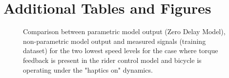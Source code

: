 \chapter{Additional Tables and Figures}\label{ch:appD}


\begin{figure}[!h]
    \centering
    \begin{subfigure}[b]{\textwidth}
        \centering
        \caption{}
        \label{fig:zdm_fit1}
    \end{subfigure}
    \begin{subfigure}[b]{\textwidth}
        \centering
        \caption{}
        \label{fig:zdm_fit2}
    \end{subfigure}
    
    \caption{Comparison between parametric model output (Zero Delay Model), non-parametric model output and measured signals (training dataset) for the two lowest speed levels for the case where torque feedback is present in the rider control model and bicycle is operating under the "haptics on" dynamics.}
    \label{fig:zdm_fitA}
 \end{figure}

